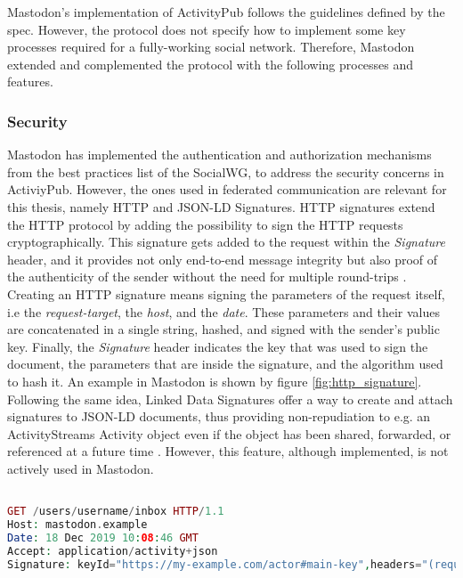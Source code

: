 Mastodon's implementation of ActivityPub follows the guidelines defined by the spec. However, the protocol does not specify how to implement some key processes required for a fully-working social network. Therefore, Mastodon extended and complemented the protocol with the following processes and features.


\subsubsection{Security}
Mastodon has implemented the authentication and authorization mechanisms from the best practices list of the SocialWG, to address the security concerns in ActiviyPub. However, the ones used in federated communication are relevant for this thesis, namely HTTP and JSON-LD Signatures. HTTP signatures extend the HTTP protocol by adding the possibility to sign the HTTP requests cryptographically. This signature gets added to the request within the \emph{Signature} header, and it provides not only end-to-end message integrity but also proof of the authenticity of the sender without the need for multiple round-trips \cite{cavage_sporny_2019}. Creating an HTTP signature means signing the parameters of the request itself, i.e the \emph{request-target}, the \emph{host}, and the \emph{date}. These parameters and their values are concatenated in a single string, hashed, and signed with the sender's public key. Finally, the \emph{Signature} header indicates the key that was used to sign the document, the parameters that are inside the signature, and the algorithm used to hash it. An example in Mastodon is shown by figure \ref{fig:http_signature}. 
Following the same idea, Linked Data Signatures offer a way to create and attach signatures to JSON-LD documents, thus providing non-repudiation to e.g. an ActivityStreams Activity object even if the object has been shared, forwarded, or referenced at a future time \cite{celik_prodromou_le_hors_2014}. However, this feature, although implemented, is not actively used in Mastodon.

\lstset{style=JSONStyle}
\begin{lstlisting}[language=PHP, caption=Signed HTTP Request, label=fig:http_signature, float=h]

GET /users/username/inbox HTTP/1.1
Host: mastodon.example
Date: 18 Dec 2019 10:08:46 GMT
Accept: application/activity+json
Signature: keyId="https://my-example.com/actor#main-key",headers="(request-target) host date",signature="Y2FiYW...IxNGRiZDk4ZA=="

\end{lstlisting}

